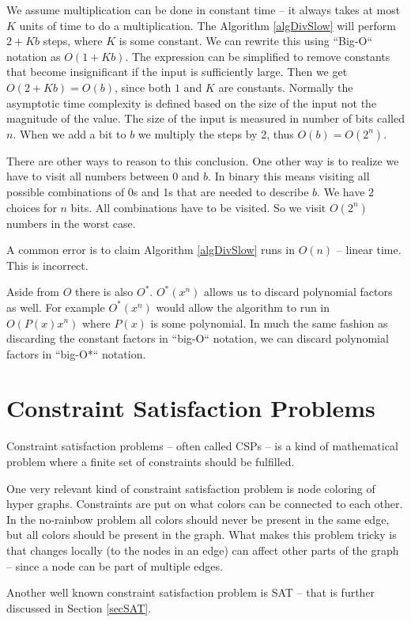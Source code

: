 \documentclass[msc,lith,english]{liuthesis}
\begin{document}
We assume multiplication can be done in constant time -- it always takes at most $K$ units of time to do a multiplication.
The Algorithm \ref{algDivSlow} will perform $ 2 + Kb $ steps, where $K$ is some
constant. We can rewrite this using ``Big-O`` notation as $O(1 + Kb)$. The expression can be
simplified to remove constants that become insignificant if the
input is sufficiently large. Then we get $O(2 + Kb) = O(b)$, since both $1$ and $K$ are constants. 
Normally the asymptotic time complexity is defined based on the size of the input not the magnitude of the value.
The size of the input is measured in number of bits called $n$. When we add a bit to $b$ we multiply the steps by 2,
thus $O(b) = O(2^n)$.

There are other ways to reason to this conclusion.
One other way is to realize we have to visit all numbers between $0$ and $b$.
In binary this means visiting all possible combinations of 0s and 1s that are needed to describe $b$.
We have 2 choices for $n$ bits. All combinations have to be visited. So we visit $O(2^n)$ numbers in the worst case. 

A common error is to claim Algorithm \ref{algDivSlow} runs in $O(n)$ -- linear time. This is incorrect.

Aside from $O$ there is also $O^*$. $O^*(x^n)$ allows us to discard polynomial factors as well. For example $O^*(x^n)$ would allow the algorithm to run in $O(P(x)x^n)$ where $P(x)$ is some polynomial. In much the same fashion as discarding the constant factors in ``big-O`` notation, we can discard polynomial factors in ``big-O*`` notation.

\section{Constraint Satisfaction Problems}
Constraint satisfaction problems -- often called CSPs -- is a kind of mathematical problem where a finite set of constraints should be fulfilled.

One very relevant kind of constraint satisfaction problem is node coloring of hyper graphs.
Constraints are put on what colors can be connected to each other. In the no-rainbow problem all colors should never be present in the same edge, but all colors should be present in the graph. What makes this problem tricky is that changes locally (to the nodes in an edge) can affect other parts of the graph -- since a node can be part of multiple edges.

Another well known constraint satisfaction problem is SAT -- that is further discussed in Section \ref{secSAT}.
\end{document}
